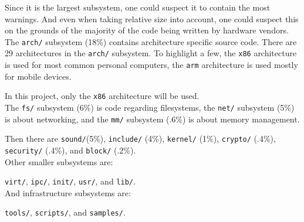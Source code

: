 \documentclass[a4paper,11pt]{report}
\newcommand{\figa}{
    \begin{figure}[!htpb]
    \centering
}
\newcommand{\figb}[2]{
    \caption{#1}
    \label{#2}
    \end{figure}
}
\begin{document}
Since it is the largest subsystem, one could suspect it to contain the most 
warnings. And even when taking relative size into account, one could suspect this
on the grounds of the majority of the code being written by hardware vendors.
\\

The \texttt{arch/} subsystem (18\%) contains architecture specific source code. 
There are 29 architectures in the \texttt{arch/} subsystem. To highlight a few, 
the \texttt{x86} architecture is used for most common personal computers,
the \texttt{arm} architecture is used mostly for mobile devices.

In this project, only the \texttt{x86} architecture will be used.
\\

The \texttt{fs/} subsystem (6\%) is code regarding filesystems, the 
\texttt{net/} subsystem (5\%) is about networking, and the \texttt{mm/} 
subsystem (.6\%) is about memory management.

Then there are \texttt{sound/}(5\%), \texttt{include/} (4\%), \texttt{kernel/} 
(1\%), \texttt{crypto/} (.4\%), \texttt{security/}  (.4\%), and \texttt{block/} 
(.2\%).
\\

Other smaller subsystems are:

\texttt{virt/}, \texttt{ipc/}, \texttt{init/}, \texttt{usr/}, and \texttt{lib/}.
\\

And infrastructure subsystems are:

\texttt{tools/}, \texttt{scripts/}, and \texttt{samples/}.

\end{document}
